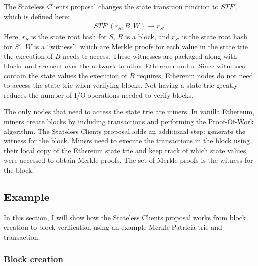 \documentclass[12pt]{article}
\newcommand{\System}{Stateless Clients\xspace}
\begin{document}
The \System proposal changes the state transition function to $STF'$, which is defined here:
\begin{align*}
  STF'(r_S, B, W) \to r_{S'}
\end{align*}
Here, $r_S$ is the state root hash for $S$, $B$ is a block, and $r_{S'}$ is the state root hash for $S'$. $W$ is a ``witness'', which are Merkle proofs for each value in the state trie the execution of $B$ needs to access. These witnesses are packaged along with blocks and are sent over the network to other Ethereum nodes. Since witnesses contain the state values the execution of $B$ requires, Ethereum nodes do not need to access the state trie when verifying blocks. Not having a state trie greatly reduces the number of I/O operations needed to verify blocks.

The only nodes that need to access the state trie are miners. In vanilla Ethereum, miners create blocks by including transactions and performing the Proof-Of-Work algorithm. The \System proposal adds an additional step: generate the witness for the block. Miners need to execute the transactions in the block using their local copy of the Ethereum state trie and keep track of which state values were accessed to obtain Merkle proofs. The set of Merkle proofs is the witness for the block.

\subsection{Example}

In this section, I will show how the \System proposal works from block creation to block verification using an example Merkle-Patricia trie and transaction.

\subsubsection{Block creation}
\end{document}
